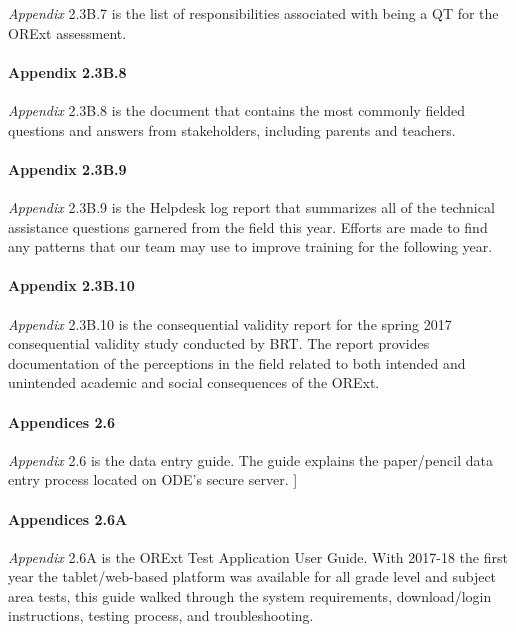 \documentclass[]{article}
\let\oldparagraph\paragraph
\renewcommand{\paragraph}[1]{\oldparagraph{#1}\mbox{}}
\begin{document}
\emph{Appendix} 2.3B.7 is the list of responsibilities associated with
being a QT for the ORExt assessment.

\paragraph{Appendix 2.3B.8}\label{appendix-2.3b.8}

\emph{Appendix} 2.3B.8 is the document that contains the most commonly
fielded questions and answers from stakeholders, including parents and
teachers.

\paragraph{Appendix 2.3B.9}\label{appendix-2.3b.9}

\emph{Appendix} 2.3B.9 is the Helpdesk log report that summarizes all of
the technical assistance questions garnered from the field this year.
Efforts are made to find any patterns that our team may use to improve
training for the following year.

\paragraph{Appendix 2.3B.10}\label{appendix-2.3b.10}

\emph{Appendix} 2.3B.10 is the consequential validity report for the
spring 2017 consequential validity study conducted by BRT. The report
provides documentation of the perceptions in the field related to both
intended and unintended academic and social consequences of the ORExt.

\paragraph{Appendices 2.6}\label{appendices-2.6}

\emph{Appendix} 2.6 is the data entry guide. The guide explains the
paper/pencil data entry process located on ODE's secure server. {]}

\paragraph{Appendices 2.6A}\label{appendices-2.6a}

\emph{Appendix} 2.6A is the ORExt Test Application User Guide. With
2017-18 the first year the tablet/web-based platform was available for
all grade level and subject area tests, this guide walked through the
system requirements, download/login instructions, testing process, and
troubleshooting.
\end{document}
